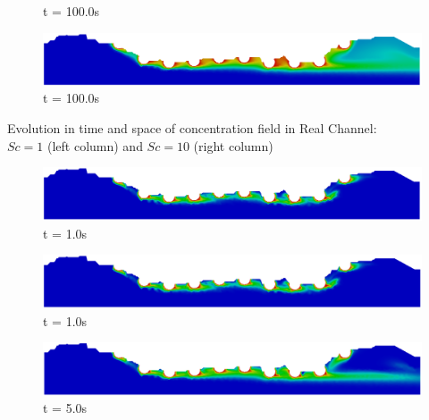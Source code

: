 \begin{frame}
\begin{figure}
\begin{minipage}{.50\linewidth}
      \tiny t = 100.0s
     \end{minipage}%
     \begin{minipage}{.50\linewidth}
      \centering
      \includegraphics[scale=0.12]{images/conc10_RealStrut8.png}\\
      \tiny t = 100.0s
     \end{minipage}
\end{figure}
\vspace{-0.2cm}
\centering \scriptsize Evolution in time and space of concentration field in Real Channel:\\
                 $Sc=1$ (left column) and $Sc=10$ (right column)
\vspace{0cm}
\begin{figure}
     \begin{minipage}{.50\linewidth}
      \centering
      \includegraphics[scale=0.12]{images/conc100_RealStrut3.png}\\
      \tiny t = 1.0s
     \end{minipage}%
     \begin{minipage}{.50\linewidth}
      \centering
      \includegraphics[scale=0.12]{images/conc1000_RealStrut3.png}\\
      \tiny t = 1.0s
     \end{minipage}
     \begin{minipage}{.50\linewidth}
     \medskip
      \centering
      \includegraphics[scale=0.12]{images/conc100_RealStrut5.png}\\
      \tiny t = 5.0s
     \end{minipage}%

\end{figure}
\end{frame}
